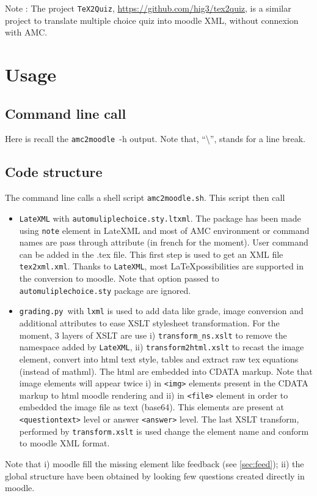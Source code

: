 \documentclass[a4paper]{article}
\newcommand{\elem}[1]{\texttt{<#1>}}
\newcommand{\py}{\texttt{grading.py}~}
\newcommand{\amc}{\texttt{amc2moodle}}
\begin{document}
Note : The project \texttt{TeX2Quiz}, \url{https://github.com/hig3/tex2quiz}, is a similar project to translate multiple choice quiz into moodle XML, without connexion with AMC.


\section{Usage}
\subsection{Command line call}
Here is recall the \amc~-h output. Note that, ``\textbackslash'', stands for a line break.




\subsection{Code structure}
The command line calls a shell script \texttt{amc2moodle.sh}. This script then call
\begin{itemize}
\item \texttt{LateXML} with \texttt{automuliplechoice.sty.ltxml}. The package has been made using \texttt{note} element in LateXML and most of  AMC environment or command names are pass through attribute (in french for the moment). User command can be added in the .tex file. This first step is used to get an XML file \texttt{tex2xml.xml}. Thanks to \texttt{LateXML}, most \LaTeX possibilities are supported in the conversion to moodle. Note that option passed to \texttt{automuliplechoice.sty} package are ignored.

\item \py with \texttt{lxml} is used to add data like grade, image conversion and additional attributes to ease XSLT stylesheet transformation. For the moment, 3 layers of XSLT are use i) \texttt{transform\_ns.xslt} to remove the namespace added by \texttt{LateXML}, ii) \texttt{transform2html.xslt} to recast the image element, convert into html text style, tables and extract raw tex equations (instead of mathml). The html are embedded into CDATA markup.
Note that image elements will appear twice i) in \elem{img} elements present in the CDATA markup to html moodle rendering and ii) in \elem{file} element in order to embedded the image file as text (base64). This elements are present at \elem{questiontext} level or answer \elem{answer} level.
The last XSLT transform, performed by \texttt{transform.xslt} is used change the element name and conform to moodle XML format.
\end{itemize}
Note that i) moodle fill the missing element like feedback (see \ref{sec:feed}); ii) the global structure have been obtained by looking few questions created directly in moodle. 
% 
\end{document}

